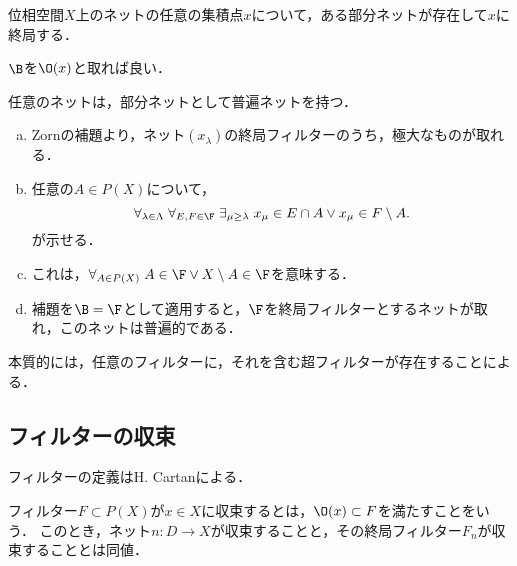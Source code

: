 \documentclass[uplatex,dvipdfmx]{jsreport}
\begin{document}
\begin{corollary}
    位相空間$X$上のネットの任意の集積点$x$について，ある部分ネットが存在して$x$に終局する．
\end{corollary}
\begin{Proof}
    $\B$を$\O(x)$と取れば良い．
\end{Proof}

\begin{theorem}
    任意のネットは，部分ネットとして普遍ネットを持つ．
\end{theorem}
\begin{Proof}\mbox{}
    \begin{enumerate}[(a)]
        \item Zornの補題より，ネット$(x_\lambda)$の終局フィルターのうち，極大なものが取れる．
        \item 任意の$A\in P(X)$について，
        \[\forall_{\lambda\in\Lambda}\;\forall_{E,F\in\F}\;\exists_{\mu\ge\lambda}\;x_\mu\in E\cap A\lor x_\mu\in F\setminus A.\]
        が示せる．
        \item これは，$\forall_{A\in P(X)}\;A\in\F\lor X\setminus A\in\F$を意味する．
        \item 補題を$\B=\F$として適用すると，$\F$を終局フィルターとするネットが取れ，このネットは普遍的である．
    \end{enumerate}
\end{Proof}
\begin{remarks}
    本質的には，任意のフィルターに，それを含む超フィルターが存在することによる．
\end{remarks}

\subsection{フィルターの収束}

\begin{tcolorbox}[colframe=ForestGreen, colback=ForestGreen!10!white,breakable,colbacktitle=ForestGreen!40!white,coltitle=black,fonttitle=\bfseries\sffamily,
title=]
    フィルターの定義はH. Cartanによる．
\end{tcolorbox}

\begin{definition}
    フィルター$F\subset P(X)$が$x\in X$に収束するとは，$\O(x)\subset F$を満たすことをいう．
    このとき，ネット$n:D\to X$が収束することと，その終局フィルター$F_n$が収束することとは同値．
\end{definition}
\end{document}
